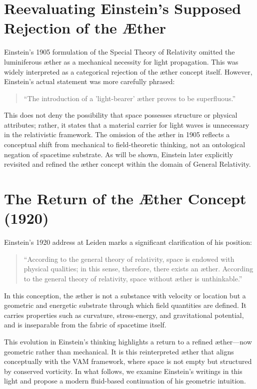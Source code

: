 \documentclass[preprint,notitlepage]{revtex4-2}
\begin{document}
\vspace{1em}

\section{Reevaluating Einstein’s Supposed Rejection of the Æther}

Einstein’s 1905 formulation of the Special Theory of Relativity omitted the luminiferous æther as a mechanical necessity for light propagation. This was widely interpreted as a categorical rejection of the æther concept itself. However, Einstein’s actual statement was more carefully phrased:

\begin{quote}
    ``The introduction of a 'light-bearer' æther proves to be superfluous.''
\end{quote}

This does not deny the possibility that space possesses structure or physical attributes; rather, it states that a material carrier for light waves is unnecessary in the relativistic framework. The omission of the æther in 1905 reflects a conceptual shift from mechanical to field-theoretic thinking, not an ontological negation of spacetime substrate. As will be shown, Einstein later explicitly revisited and refined the æther concept within the domain of General Relativity.

\section{The Return of the Æther Concept (1920)}

Einstein’s 1920 address at Leiden marks a significant clarification of his position:

\begin{quote}
    ``According to the general theory of relativity, space is endowed with physical qualities; in this sense, therefore, there exists an æther. According to the general theory of relativity, space without æther is unthinkable.''~\cite{einstein1920aether}
\end{quote}

In this conception, the æther is not a substance with velocity or location but a geometric and energetic substrate through which field quantities are defined. It carries properties such as curvature, stress-energy, and gravitational potential, and is inseparable from the fabric of spacetime itself.

This evolution in Einstein's thinking highlights a return to a refined æther—now geometric rather than mechanical. It is this reinterpreted æther that aligns conceptually with the VAM framework, where space is not empty but structured by conserved vorticity. In what follows, we examine Einstein’s writings in this light and propose a modern fluid-based continuation of his geometric intuition.
\end{document}
